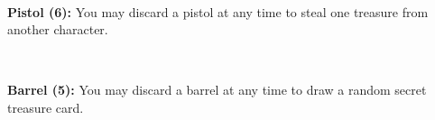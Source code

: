 \begin{minipage}{1.5cm}
\end{minipage}
\ 
\begin{minipage}{5.5cm}
\raggedright
\textbf{Pistol (6):} You may discard a pistol at any time to steal one treasure from another character.
\end{minipage}

\begin{minipage}{1.5cm}
\end{minipage}
\ 
\begin{minipage}{6cm}
\raggedright
\textbf{Barrel (5):} You may discard a barrel at any time to draw a random secret treasure card. 
\end{minipage}

